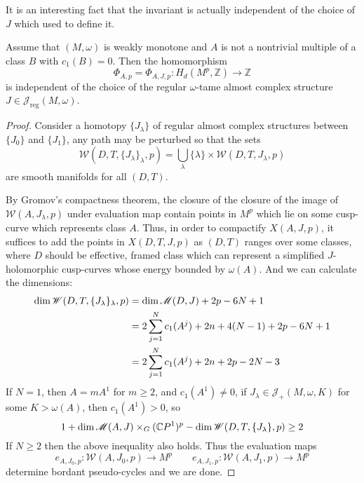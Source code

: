 \documentclass[twoside]{article}
\begin{document}
It is an interesting fact that the invariant is actually independent of the choice of $J$ which used to define it.

\begin{proposition} \label{prop-4-2}
    Assume that $(M,\omega)$ is weakly monotone and 
    $A$ is not a nontrivial multiple of a class $B$ with $c_1(B)=0$. Then the homomorphism
    \[\Phi_{A,p}=\Phi_{A,J,p}\colon H_d(M^p,\mathbb{Z})\rightarrow \mathbb{Z}\]
    is independent of the choice of the regular $\omega$-tame 
    almost complex structure $J\in \mathscr{J}_{\textrm{reg}}(M,\omega)$.
\end{proposition}

\begin{proof}
    Consider a homotopy $\{J_\lambda\}$ of regular almost complex structures 
    between $\{J_0\}$ and $\{J_1\}$, any path may be perturbed so that the sets
    \[\mathscr{W}(D,T,\{J_\lambda\}_\lambda,p)=\bigcup_{\lambda}\{\lambda\}\times\mathscr{W}(D,T,J_\lambda,p)\]
    are smooth manifolds for all $(D,T)$.
    
    By Gromov's compactness theorem, the closure of the closure of 
    the image of $\mathscr{W}(A,J_\lambda,p)$ under evaluation map 
    contain points in $M^p$ which lie on some cusp-curve 
    which represents class $A$. Thus, in order to compactify $X(A,J,p)$, 
    it suffices to add the points in $X(D,T,J,p)$ as $(D,T)$ ranges over some classes, 
    where $D$ should be effective, framed class which can represent 
    a simplified $J$-holomorphic cusp-curves 
    whose energy bounded by $\omega(A)$. And we can calculate the dimensions:
    \[ \begin{aligned}
        \dim\mathscr{W}(D,T,\{J_\lambda\}_\lambda,p)&= \dim \mathscr{M}(D,J)+2p-6N+1\\
        &=2\sum_{j=1}^{N}c_1(A^j)+2n+4(N-1)+2p-6N+1\\
        &=2\sum_{j=1}^{N}c_1(A^j)+2n+2p-2N-3
    \end{aligned} \]
    If $N=1$, then $A=mA^1$ for $m\geq 2$, and $c_1(A^1)\neq0$, 
    if $J_\lambda\in\mathscr{J}_+(M,\omega,K)$ for some $K>\omega(A)$, then $c_1(A^1)>0$, so
    \[1+\dim \mathscr{M}(A,J)\times_G(\mathbb{C}P^{1})^p-\dim\mathscr{W}(D,T,\{J_\lambda\},p)\geq 2\]
    If $N\geq 2$ then the above inequality also holds.
    Thus the evaluation maps
    \[e_{A,J_0,p}\colon \mathscr{W}(A,J_0,p)\rightarrow M^p\qquad e_{A,J_1,p}\colon \mathscr{W}(A,J_1,p)\rightarrow M^p\]
    determine bordant pseudo-cycles and we are done. 
\end{proof}
\end{document}
